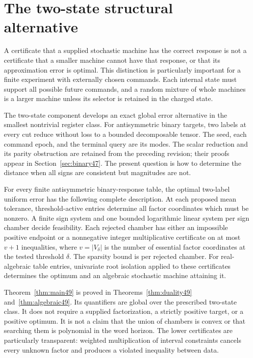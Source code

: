 \section{The two-state structural alternative}
A certificate that a supplied stochastic machine has the correct
response is not a certificate that a smaller machine cannot have that
response, or that its approximation error is optimal. This distinction
is particularly important for a finite experiment with externally
chosen commands. Each internal state must support all possible future
commands, and a random mixture of whole machines is a larger machine
unless its selector is retained in the charged state.

The two-state component develops an exact global error alternative in the
smallest nontrivial register class. For antisymmetric binary targets,
two labels at every cut reduce without loss to a bounded decomposable
tensor. The seed, each command epoch, and the terminal query are its
modes. The scalar reduction and its parity obstruction are retained
from the preceding revision; their proofs appear in
Section~\ref{sec:binary47}. The present question is how to determine
the distance when all signs are consistent but magnitudes are not.

\begin{theorem}\label{thm:main49}
For every finite antisymmetric binary-response table, the optimal
two-label uniform error has the following complete description.
At each proposed mean tolerance, threshold-active entries determine
all factor coordinates which must be nonzero. A finite sign system
and one bounded logarithmic linear system per sign chamber decide
feasibility. Each rejected chamber has either an impossible positive
endpoint or a nonnegative integer multiplicative certificate on at
most $v+1$ inequalities, where $v=|V_\delta|$ is the number of essential factor coordinates at the tested threshold $\delta$. The sparsity bound is per rejected chamber.
For real-algebraic table entries, univariate root isolation applied
to these certificates determines the optimum and an algebraic
stochastic machine attaining it.
\end{theorem}

Theorem~\ref{thm:main49} is proved in
Theorems~\ref{thm:duality49} and~\ref{thm:algebraic49}.
Its quantifiers are global over the prescribed two-state class.
It does not require a supplied factorization, a strictly positive
target, or a positive optimum. It is not a claim that the union of
chambers is convex or that searching them is polynomial in the word
horizon. The lower certificates are particularly transparent:
weighted multiplication of interval constraints cancels every
unknown factor and produces a violated inequality between data.

